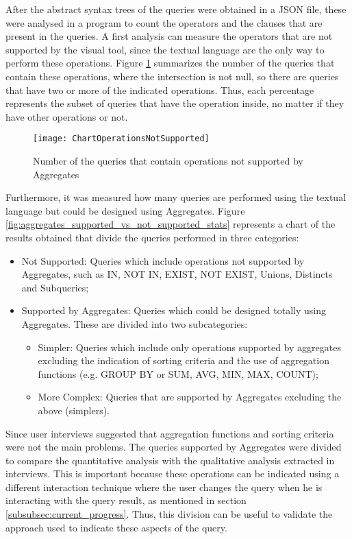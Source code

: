 After the abstract syntax trees of the queries were obtained in a JSON file, these were analysed in a program to count the operators and the clauses that are present in the queries. A first analysis can measure the operators that are not supported by the visual tool, since the textual language are the only way to perform these operations. Figure \ref{fig:aggregates_operations_not_supported_stats} summarizes the number of the queries that contain these operations, where the intersection is not null, so there are queries that have two or more of the indicated operations. Thus, each percentage represents the subset of queries that have the operation inside, no matter if they have other operations or not.

\begin{figure}[htbp]
	\centering
	\texttt{[image: ChartOperationsNotSupported]}
	\caption{Number of the queries that contain operations not supported by Aggregates}
	\label{fig:aggregates_operations_not_supported_stats}
\end{figure}

Furthermore, it was measured how many queries are performed using the textual language but could be designed using Aggregates. Figure \ref{fig:aggregates_supported_vs_not_supported_stats} represents a chart of the results obtained that divide the queries performed in three categories:

\begin{itemize}
    \item Not Supported: Queries which include operations not supported by Aggregates, such as IN, NOT IN, EXIST, NOT EXIST, Unions, Distincts and Subqueries;
    \item Supported by Aggregates: Queries which could be designed totally using Aggregates. These are divided into two subcategories:
    \begin{itemize}
        \item Simpler: Queries which include only operations supported by aggregates excluding the indication of sorting criteria and the use of aggregation functions (e.g. GROUP BY or SUM, AVG, MIN, MAX, COUNT);
        \item More Complex: Queries that are supported by Aggregates excluding the above (simplers).
    \end{itemize}
\end{itemize}

Since user interviews suggested that aggregation functions and sorting criteria were not the main problems. The queries supported by Aggregates were divided to compare the quantitative analysis with the qualitative analysis extracted in interviews. This is important because these operations can be indicated using a different interaction technique where the user changes the query when he is interacting with the query result, as mentioned in section \ref{subsubsec:current_progress}. Thus, this division can be useful to validate the approach used to indicate these aspects of the query.


